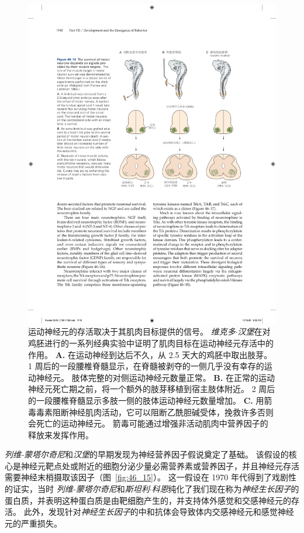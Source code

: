 \begin{figure}[htbp]
	\centering
	\includegraphics[width=0.85\linewidth]{chap46/fig_46_14}
	\caption{运动神经元的存活取决于其肌肉目标提供的信号。
		\textit{维克多$\cdot$汉堡}在对鸡胚进行的一系列经典实验中证明了肌肉目标在运动神经元存活中的作用\cite{purves1985principles}。
		\textbf{A.} 在运动神经到达后不久，从 2.5 天大的鸡胚中取出肢芽。
		1 周后的一段腰椎脊髓显示，在脊髓被剥夺的一侧几乎没有幸存的运动神经元。
		肢体完整的对侧运动神经元数量正常。
		\textbf{B.} 在正常的运动神经元死亡期之前，将一个额外的肢芽移植到宿主肢体附近。
		2 周后的一段腰椎脊髓显示多肢一侧的肢体运动神经元数量增加。
		\textbf{C.} 用箭毒毒素阻断神经肌肉活动，它可以阻断乙酰胆碱受体，挽救许多否则会死亡的运动神经元。
		箭毒可能通过增强非活动肌肉中营养因子的释放来发挥作用。}
	\label{fig:46_14}
\end{figure}


\textit{列维-蒙塔尔奇尼}和\textit{汉堡}的早期发现为神经营养因子假说奠定了基础。
该假设的核心是神经元靶点处或附近的细胞分泌少量必需营养素或营养因子，并且神经元存活需要神经末梢摄取该因子（图~\ref{fig:46_15}）。
这一假设在 1970 年代得到了戏剧性的证实，当时 \textit{列维-蒙塔尔奇尼}和\textit{斯坦利$\cdot$科恩}纯化了我们现在称为\textit{神经生长因子}的蛋白质，并表明这种蛋白质是由靶细胞产生的，并支持体外感觉和交感神经元的存活。
此外，发现针对\textit{神经生长因子}的中和抗体会导致体内交感神经元和感觉神经元的严重损失。


